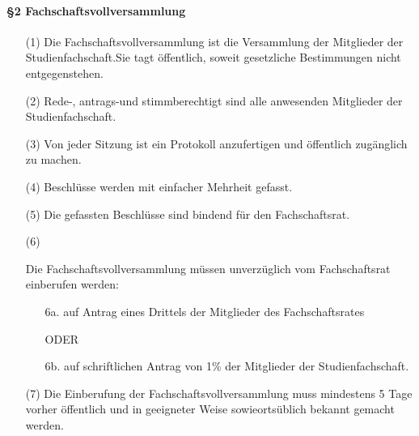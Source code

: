 {    \paragraph{§2 Fachschaftsvollversammlung}
    \begin{enumerate}
        \item[(1)] Die Fachschaftsvollversammlung ist die Versammlung der Mitglieder der Studienfachschaft.Sie tagt öffentlich, soweit gesetzliche Bestimmungen nicht entgegenstehen.
        \item[(2)] Rede-, antrags-und stimmberechtigt sind alle anwesenden Mitglieder der Studienfachschaft.
        \item[(3)] Von jeder Sitzung ist ein Protokoll anzufertigen und öffentlich zugänglich zu machen.
        \item[(4)] Beschlüsse werden mit einfacher Mehrheit gefasst.
        \item[(5)] Die gefassten Beschlüsse sind bindend für den Fachschaftsrat.
        \item[(6)] {Die  Fachschaftsvollversammlung  müssen  unverzüglich  vom  Fachschaftsrat  einberufen werden: 
            \begin{enumerate}
                \item[6a.] auf Antrag eines Drittels der Mitglieder des Fachschaftsrates
                \item[] ODER 
                \item[6b.]  auf schriftlichen Antrag von 1\% der Mitglieder der Studienfachschaft.
            \end{enumerate}}
        \item[(7)] Die Einberufung der Fachschaftsvollversammlung muss mindestens 5 Tage vorher öffentlich und in geeigneter Weise sowieortsüblich bekannt gemacht werden.   
    \end{enumerate}
}
